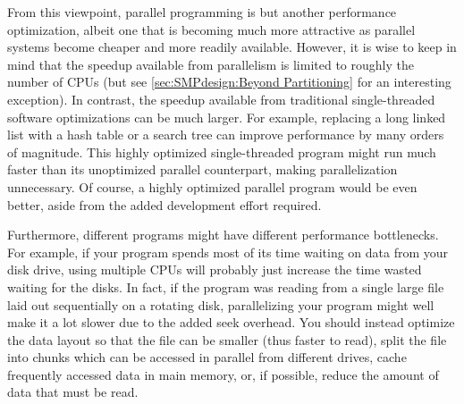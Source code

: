 From this viewpoint, parallel programming is but another performance
optimization, albeit one that is becoming much more attractive
as parallel systems become cheaper and more readily available.
However, it is wise to keep in mind that the speedup available from
parallelism is limited to roughly the number of CPUs
(but see \cref{sec:SMPdesign:Beyond Partitioning}
for an interesting exception).
In contrast, the speedup available from traditional single-threaded
software optimizations can be much larger.
For example, replacing a long linked list with a hash table
or a search tree can improve performance by many orders of magnitude.
This highly optimized single-threaded program might run much
faster than its unoptimized parallel counterpart, making parallelization
unnecessary.
Of course, a highly optimized parallel program would be even better,
aside from the added development effort required.

Furthermore, different programs might have different performance
bottlenecks.
For example, if your program spends most of its time
waiting on data from your disk drive,
using multiple CPUs will probably just increase the time wasted waiting
for the disks.
In fact, if the program was reading from a single large file laid out
sequentially on a rotating disk, parallelizing your program might
well make it a lot slower due to the added seek overhead.
You should instead optimize the data layout so that
the file can be smaller (thus faster to read), split the file into chunks
which can be accessed in parallel from different drives,
cache frequently accessed data in main memory,
or, if possible,
reduce the amount of data that must be read.

\QuickQuizEnd

